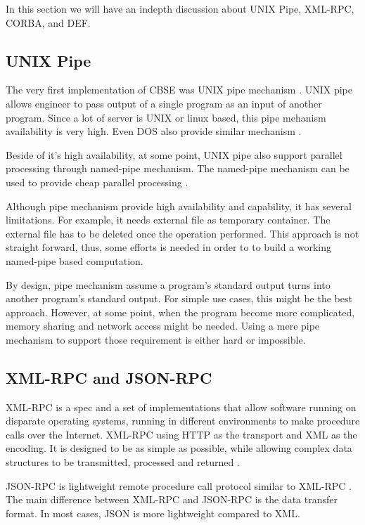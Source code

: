 \documentclass[conference]{IEEEtran}
\begin{document}
In this section we will have an indepth discussion about UNIX Pipe, XML-RPC, CORBA, and
DEF.


\subsection{UNIX Pipe}

The very first implementation of CBSE was UNIX pipe mechanism \cite{mcilroy1968mass}. 
UNIX pipe allows engineer to pass output of a single program as an input of 
another program. Since a lot of server is UNIX or linux based, this pipe 
mehanism availability is very high. Even DOS also provide similar mechanism 
\cite{dos7command}.

Beside of it's high availability, at some point, UNIX pipe also support parallel
processing through named-pipe mechanism. The named-pipe mechanism can be used to 
provide cheap parallel processing \cite{conway2003parallel}. 

Although pipe mechanism provide high availability and capability, 
it has several limitations. For example, it needs external file as temporary 
container. The external file has to be deleted once the operation performed. 
This approach is not straight forward, thus, some efforts is needed in order to 
to build a working named-pipe based computation. 

By design, pipe mechanism assume a program's standard output turns into another 
program's standard output. For simple use cases, this might be the best approach. 
However, at some point, when the program become more complicated, memory sharing 
and network access might be needed. Using a mere pipe mechanism to support those 
requirement is either hard or impossible.


\subsection{XML-RPC and JSON-RPC}

XML-RPC is a spec and a set of implementations that allow software running on 
disparate operating systems, running in different environments to make procedure 
calls over the Internet. XML-RPC using HTTP as the transport and XML as the encoding. It is designed to be as simple as possible, while allowing complex data structures to be transmitted, processed and returned \cite{xmlrpc}.

JSON-RPC is lightweight remote procedure call protocol similar to XML-RPC 
\cite{jsonrpc}. The main difference between XML-RPC and JSON-RPC is the data transfer
format. In most cases, JSON is more lightweight compared to XML.
\end{document}
